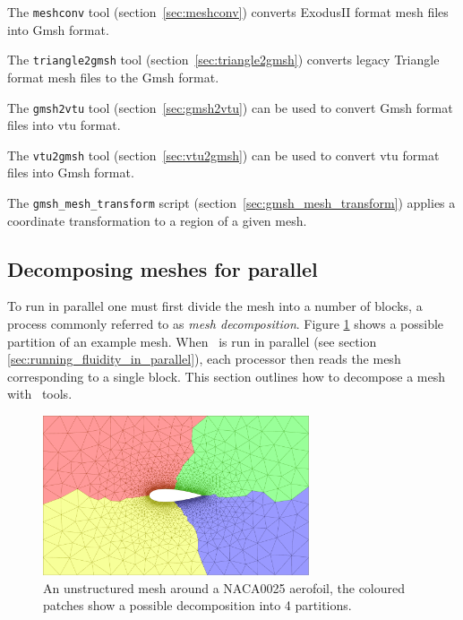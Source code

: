 The \lstinline[language = Bash]+meshconv+ tool (section~\ref{sec:meshconv}) converts ExodusII format mesh files into Gmsh format.

The \lstinline[language = Bash]+triangle2gmsh+ tool (section~\ref{sec:triangle2gmsh}) converts legacy Triangle format mesh files to the Gmsh format.

The \lstinline[language = Bash]+gmsh2vtu+ tool (section~\ref{sec:gmsh2vtu}) can be used to convert Gmsh format files into vtu format.

The \lstinline[language = Bash]+vtu2gmsh+ tool (section~\ref{sec:vtu2gmsh}) can be used to convert vtu format files into Gmsh format.

The \lstinline[language = Bash]+gmsh_mesh_transform+ script (section~\ref{sec:gmsh_mesh_transform}) applies a coordinate transformation to a region of a given mesh.



\subsection{Decomposing meshes for parallel}
\label{decomp_meshes_parallel}
To run in parallel one must first divide the mesh into a number of blocks, a process
commonly referred to as \emph{mesh decomposition}. Figure \ref{fig:NACA0025_mesh_with_partitions}
shows a possible partition of an example mesh. When \fluidity\ is run in parallel (see section
\ref{sec:running_fluidity_in_parallel}), each processor then reads the mesh corresponding to a
single block. This section outlines how to decompose a mesh with \fluidity\ tools.
\begin{figure}[htbp]
 \centering
  \includegraphics[width=0.7\textwidth]{misc_images/NACA0025_mesh_with_partitions.pdf}
  \caption{An unstructured mesh around a NACA0025 aerofoil, the coloured patches show a
           possible decomposition into 4 partitions.}
  \label{fig:NACA0025_mesh_with_partitions}
\end{figure}

